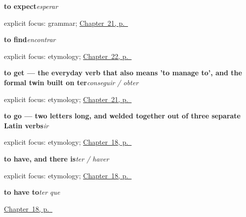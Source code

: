 \noindent\begin{minipage}[t]{\linewidth}
\raggedright
\textbf{to expect}\enspace\emph{esperar}\par
\footnotesize explicit focus: grammar; \hyperref[ch:pt-bringing-getting-waiting-buying]{Chapter~21, p.~\pageref*{ch:pt-bringing-getting-waiting-buying}}
\end{minipage}\par\smallskip

\noindent\begin{minipage}[t]{\linewidth}
\raggedright
\textbf{to find}\enspace\emph{encontrar}\par
\footnotesize explicit focus: etymology; \hyperref[ch:pt-answering-meeting-playing]{Chapter~22, p.~\pageref*{ch:pt-answering-meeting-playing}}
\end{minipage}\par\smallskip

\noindent\begin{minipage}[t]{\linewidth}
\raggedright
\textbf{to get — the everyday verb that also means 'to manage to', and the formal twin built on ter}\enspace\emph{conseguir / obter}\par
\footnotesize explicit focus: etymology; \hyperref[ch:pt-bringing-getting-waiting-buying]{Chapter~21, p.~\pageref*{ch:pt-bringing-getting-waiting-buying}}
\end{minipage}\par\smallskip

\noindent\begin{minipage}[t]{\linewidth}
\raggedright
\textbf{to go — two letters long, and welded together out of three separate Latin verbs}\enspace\emph{ir}\par
\footnotesize explicit focus: etymology; \hyperref[ch:pt-core-verbs]{Chapter~18, p.~\pageref*{ch:pt-core-verbs}}
\end{minipage}\par\smallskip

\noindent\begin{minipage}[t]{\linewidth}
\raggedright
\textbf{to have, and there is}\enspace\emph{ter / haver}\par
\footnotesize explicit focus: etymology; \hyperref[ch:pt-core-verbs]{Chapter~18, p.~\pageref*{ch:pt-core-verbs}}
\end{minipage}\par\smallskip

\noindent\begin{minipage}[t]{\linewidth}
\raggedright
\textbf{to have to}\enspace\emph{ter que}\par
\footnotesize \hyperref[ch:pt-core-verbs]{Chapter~18, p.~\pageref*{ch:pt-core-verbs}}
\end{minipage}\par\smallskip

